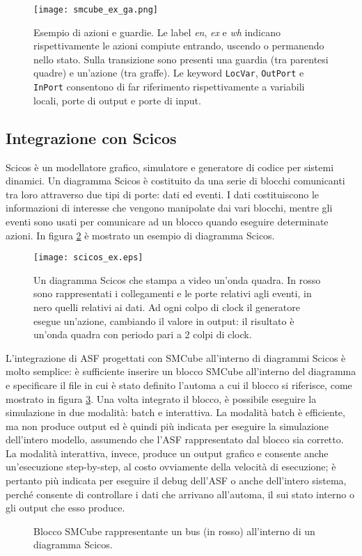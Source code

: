 \begin{figure}
\centering
\texttt{[image: smcube\_ex\_ga.png]}
\caption{Esempio di azioni e guardie. Le label \textit{en}, \textit{ex} e \textit{wh} indicano rispettivamente le azioni compiute entrando, uscendo o permanendo nello stato. Sulla transizione sono presenti una guardia (tra parentesi quadre) e un'azione (tra graffe). Le keyword \texttt{LocVar}, \texttt{OutPort} e \texttt{InPort} consentono di far riferimento rispettivamente a variabili locali, porte di output e porte di input.}
\label{Fig:smcube_ex_ga}
\end{figure}

\subsection{Integrazione con Scicos}
Scicos è un modellatore grafico, simulatore e generatore di codice per sistemi dinamici. Un diagramma Scicos è costituito da una serie di blocchi comunicanti tra loro attraverso due tipi di porte: dati ed eventi. I dati costituiscono le informazioni di interesse che vengono manipolate dai vari blocchi, mentre gli eventi sono usati per comunicare ad un blocco quando eseguire determinate azioni. In figura \ref{Fig:scicos_ex} è mostrato un esempio di diagramma Scicos.\\

\begin{figure}
\centering
\texttt{[image: scicos\_ex.eps]}
\caption{Un diagramma Scicos che stampa a video un'onda quadra. In rosso sono rappresentati i collegamenti e le porte relativi agli eventi, in nero quelli relativi ai dati. Ad ogni colpo di clock il generatore esegue un'azione, cambiando il valore in output: il risultato è un'onda quadra con periodo pari a 2 colpi di clock.}
\label{Fig:scicos_ex}
\end{figure}

L'integrazione di ASF progettati con SMCube all'interno di diagrammi Scicos è molto semplice: è sufficiente inserire un blocco SMCube all'interno del diagramma e specificare il file in cui è stato definito l'automa a cui il blocco si riferisce, come mostrato in figura \ref{Fig:smcube_scicos_ex}. Una volta integrato il blocco, è possibile eseguire la simulazione in due modalità: batch e interattiva. La modalità batch è efficiente, ma non produce output ed è quindi più indicata per eseguire la simulazione dell'intero modello, assumendo che l'ASF rappresentato dal blocco sia corretto. La modalità interattiva, invece, produce un output grafico e consente anche un'esecuzione step-by-step, al costo ovviamente della velocità di esecuzione; è pertanto più indicata per eseguire il debug dell'ASF o anche dell'intero sistema, perché consente di controllare i dati che arrivano all'automa, il sui stato interno o gli output che esso produce.

\begin{figure}
\centering
{}%
\caption{Blocco SMCube rappresentante un bus (in rosso) all'interno di un diagramma Scicos.}
\label{Fig:smcube_scicos_ex}
\end{figure}